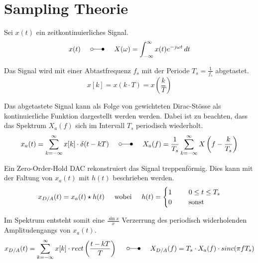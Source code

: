 \section{Sampling Theorie}

Sei $x(t)$ ein zeitkontinuierliches Signal.
\begin{equation*}
    x(t) \knochen X(\omega) = \int_{-\infty}^{\infty} x(t)e^{-j\omega t}\,dt
\end{equation*}

Das  Signal  wird  mit  einer  Abtastfrequenz  $f_s$  mit  der  Periode  $T_s  =
\frac{1}{f_s}$ abgetastet.
\begin{equation*}
    x[k] = x(k\cdot T) = x\left(\frac{k}{T}\right)
\end{equation*}

Das  abgetastete  Signal  kann  als  Folge  von  gewichteten Dirac-St\"osse  als
kontinuierliche Funktion dargestellt werden  werden. Dabei ist zu beachten, dass
das  Spektrum   $X_a(f)$   sich   im   Intervall  $T_s$  periodisch  wiederholt.
\begin{equation*}
    x_a(t) = \sum_{k=-\infty}^{\infty} x[k]\cdot\delta(t - kT) \knochen X_a(f) = \frac{1}{T_s} \sum_{k=-\infty}^{\infty} X\left(f - \frac{k}{T_s}\right)
\end{equation*}

Ein Zero-Order-Hold  DAC rekonstruiert das Signal treppenf\"ormig. Dies kann mit
der Faltung von $x_a(t)$ mit $h(t)$ beschrieben werden.
\begin{equation*}
    x_{D/A}(t) = x_a(t) \star h(t) \hspace{5mm}\textrm{wobei}\hspace{5mm} h(t) =
    \begin{cases}
        1    & \hspace{5mm} 0 \le t \le T_s \\
        0    & \hspace{5mm} \textrm{sonst}  \\
    \end{cases}
\end{equation*}

Im Spektrum entsteht somit eine $\frac{\sin  x}{x}$  Verzerrung  des  periodisch
widerholenden Amplitudengangs von $x_a(t)$.
\begin{equation*}
    x_{D/A}(t)= \sum_{k=-\infty}^{\infty} x[k] \cdot rect\left(\frac{t - kT}{T}\right) \knochen X_{D/A}(f) = T_s \cdot X_a(f) \cdot sinc(\pi f T_s)
\end{equation*}



